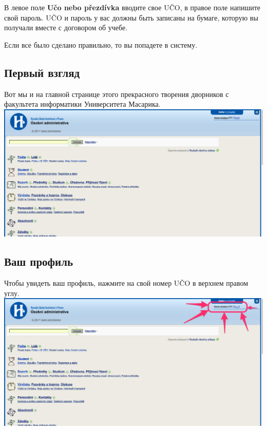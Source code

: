 \documentclass[a4paper,12pt]{article}
\begin{document}
В левое поле \textbf{Učo nebo přezdívka} вводите свое UČO, в правое поле напишите свой пароль.
UČO и пароль у вас должны быть записаны на бумаге, которую вы получали вместе с договором об учебе.

Если все было сделано правильно, то вы попадете в систему.

\subsection{Первый взгляд}
Вот мы и на главной странице этого прекрасного творения дворников
с факультета информатики Университета Масарика. \\

\includegraphics[width=\textwidth]{s04} \\


\newpage
\subsection{Ваш профиль}

Чтобы увидеть ваш профиль, нажмите на свой номер UČO в верхнем правом углу. \\

\includegraphics[width=\textwidth]{s05} \\
\end{document}
